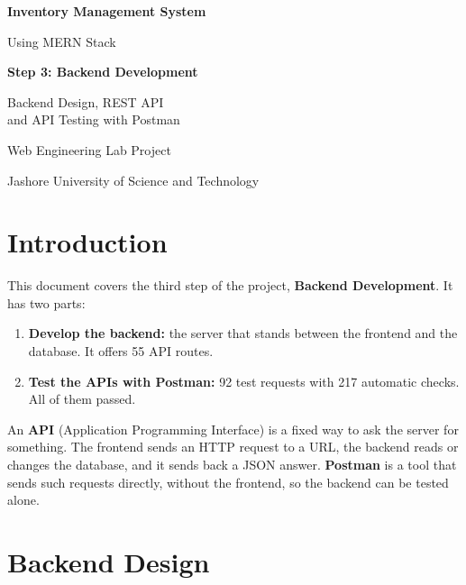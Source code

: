 \documentclass[11pt,a4paper]{article}
\begin{document}
\begin{titlepage}
  \centering
  \vspace*{3cm}
  {\LARGE\bfseries Inventory Management System\par}
  \vspace{0.4cm}
  {\Large Using MERN Stack\par}
  \vspace{1.5cm}
  {\Large\bfseries Step 3: Backend Development\par}
  \vspace{0.4cm}
  {\large Backend Design, REST API\\ and API Testing with Postman\par}
  \vfill
  {\large Web Engineering Lab Project\par}
  \vspace{0.3cm}
  {\large Jashore University of Science and Technology\par}
  \vspace{2cm}
\end{titlepage}

\tableofcontents
\newpage

\section{Introduction}
This document covers the third step of the project, \textbf{Backend Development}. It has two parts:
\begin{enumerate}
  \item \textbf{Develop the backend:} the server that stands between the frontend and the database. It offers 55 API routes.
  \item \textbf{Test the APIs with Postman:} 92 test requests with 217 automatic checks. All of them passed.
\end{enumerate}
An \textbf{API} (Application Programming Interface) is a fixed way to ask the server for something. The frontend sends an HTTP request to a URL, the backend reads or changes the database, and it sends back a JSON answer. \textbf{Postman} is a tool that sends such requests directly, without the frontend, so the backend can be tested alone.

\section{Backend Design}
\end{document}
